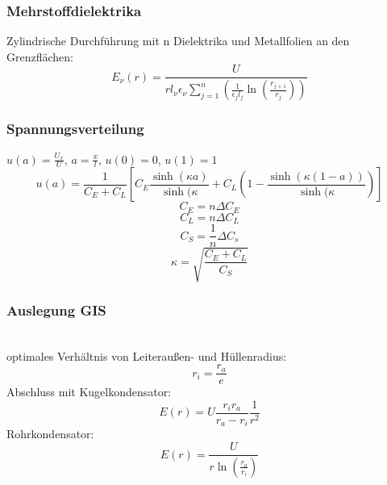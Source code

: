 \documentclass[9pt,a4paper]{scrartcl}
\begin{document}
\begin{multicols}{3}
		\subsubsection{Mehrstoffdielektrika}
		Zylindrische Durchführung mit n Dielektrika und Metallfolien an den Grenzflächen:
		\[E_\nu(r) = \frac{U}{r l_\nu \epsilon_\nu \sum_{j=1}^n \left( \frac{1}{\epsilon_j l_j} \ln\left( \frac{r_{j+1}}{r_j}\right) \right) }\]
		
		\subsubsection{Spannungsverteilung}
		$u(a) = \frac{U_x}{U}$, $a = \frac{x}{l}$, $u(0) = 0$, $u(1) = 1$
		\[u(a) = \frac{1}{C_E + C_L} \left[ C_E \frac{\sinh(\kappa a)}{\sinh(\kappa} + C_L \left( 1 - \frac{\sinh(\kappa (1 - a))}{\sinh(\kappa} \right) \right]\]
		\[C_E = n \Delta C_E\]
		\[C_L = n \Delta C_L\]
		\[C_S = \frac{1}{n} \Delta C_s\]
		\[\kappa = \sqrt{\frac{C_E + C_L}{C_S}}\]
		
		\subsubsection{Auslegung GIS} \hfill \\
		optimales Verhältnis von Leiteraußen- und Hüllenradius:
		\[r_i = \frac{r_a}{e}\]
		Abschluss mit Kugelkondensator:
		\[E(r) = U \frac{r_i r_a}{r_a - r_i} \frac{1}{r^2}\]
		Rohrkondensator:
		\[E(r) = \frac{U}{r \ln \left( \frac{r_a}{r_i}\right)}\]
		

\end{multicols}

\end{document}
